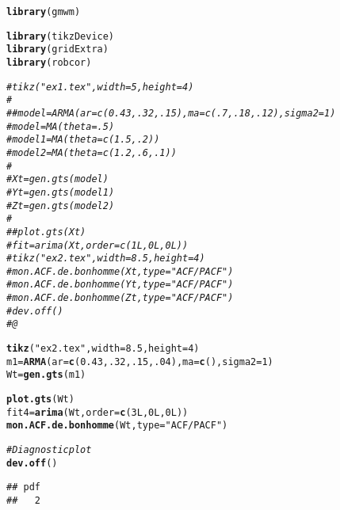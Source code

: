 \documentclass{article}\usepackage[]{graphicx}\usepackage[]{color}
\makeatletter
\newcommand{\hlnum}[1]{\textcolor[rgb]{0.686,0.059,0.569}{#1}}%
\newcommand{\hlstr}[1]{\textcolor[rgb]{0.192,0.494,0.8}{#1}}%
\newcommand{\hlcom}[1]{\textcolor[rgb]{0.678,0.584,0.686}{\textit{#1}}}%
\newcommand{\hlstd}[1]{\textcolor[rgb]{0.345,0.345,0.345}{#1}}%
\newcommand{\hlkwb}[1]{\textcolor[rgb]{0.69,0.353,0.396}{#1}}%
\newcommand{\hlkwc}[1]{\textcolor[rgb]{0.333,0.667,0.333}{#1}}%
\newcommand{\hlkwd}[1]{\textcolor[rgb]{0.737,0.353,0.396}{\textbf{#1}}}%
\newenvironment{kframe}{%
 \def\at@end@of@kframe{}%
 \ifinner\ifhmode%
  \def\at@end@of@kframe{\end{minipage}}%
  \begin{minipage}{\columnwidth}%
 \fi\fi%
 \def\FrameCommand##1{\hskip\@totalleftmargin \hskip-\fboxsep
 \colorbox{shadecolor}{##1}\hskip-\fboxsep
     \hskip-\linewidth \hskip-\@totalleftmargin \hskip\columnwidth}%
 \MakeFramed {\advance\hsize-\width
   \@totalleftmargin\z@ \linewidth\hsize
   \@setminipage}}%
 {\par\unskip\endMakeFramed%
 \at@end@of@kframe}
\newenvironment{knitrout}{}{} %
\makeatother
\begin{document}
\begin{knitrout}
\color{fgcolor}\begin{kframe}
\begin{alltt}
\hlkwd{library}\hlstd{(gmwm)}
\end{alltt}


{\ttfamily\noindent\itshape\color{messagecolor}{\#\# Loading required package: ggplot2}}\begin{alltt}
\hlkwd{library}\hlstd{(tikzDevice)}
\hlkwd{library}\hlstd{(gridExtra)}
\hlkwd{library}\hlstd{(robcor)}

\hlcom{# tikz("ex1.tex", width = 5, height = 4)}
\hlcom{# }
\hlcom{# #model = ARMA(ar = c(0.43,.32, .15), ma = c(.7, .18, .12),sigma2 = 1)}
\hlcom{# model = MA(theta = .5)}
\hlcom{# model1 = MA(theta = c(1.5,.2))}
\hlcom{# model2 = MA(theta = c(1.2,.6,.1))}
\hlcom{# }
\hlcom{# Xt = gen.gts(model)}
\hlcom{# Yt = gen.gts(model1)}
\hlcom{# Zt = gen.gts(model2)}
\hlcom{# }
\hlcom{# #plot.gts(Xt)}
\hlcom{# fit = arima(Xt,order = c(1L,0L,0L))}
\hlcom{# tikz("ex2.tex", width = 8.5, height = 4)}
\hlcom{# mon.ACF.de.bonhomme(Xt, type = "ACF/PACF")}
\hlcom{# mon.ACF.de.bonhomme(Yt, type = "ACF/PACF")}
\hlcom{# mon.ACF.de.bonhomme(Zt, type = "ACF/PACF")}
\hlcom{# dev.off()}
\hlcom{# @}

\hlkwd{tikz}\hlstd{(}\hlstr{"ex2.tex"}\hlstd{,} \hlkwc{width} \hlstd{=} \hlnum{8.5}\hlstd{,} \hlkwc{height} \hlstd{=} \hlnum{4}\hlstd{)}
\hlstd{m1} \hlkwb{=} \hlkwd{ARMA}\hlstd{(}\hlkwc{ar} \hlstd{=} \hlkwd{c}\hlstd{(}\hlnum{0.43}\hlstd{,}\hlnum{.32}\hlstd{,} \hlnum{.15}\hlstd{,} \hlnum{.04}\hlstd{),} \hlkwc{ma} \hlstd{=} \hlkwd{c}\hlstd{() ,}\hlkwc{sigma2} \hlstd{=} \hlnum{1}\hlstd{)}
\hlstd{Wt} \hlkwb{=} \hlkwd{gen.gts}\hlstd{(m1)}

\hlkwd{plot.gts}\hlstd{(Wt)}
\hlstd{fit4} \hlkwb{=} \hlkwd{arima}\hlstd{(Wt,}\hlkwc{order} \hlstd{=} \hlkwd{c}\hlstd{(}\hlnum{3L}\hlstd{,}\hlnum{0L}\hlstd{,}\hlnum{0L}\hlstd{))}
\hlkwd{mon.ACF.de.bonhomme} \hlstd{(Wt,} \hlkwc{type} \hlstd{=} \hlstr{"ACF/PACF"}\hlstd{)}
\end{alltt}


{\ttfamily\noindent\color{warningcolor}{\#\# Warning: Removed 1 rows containing missing values (geom\_segment).}}\begin{alltt}
\hlcom{# Diagnostic plot}
\hlkwd{dev.off}\hlstd{()}
\end{alltt}
\begin{verbatim}
## pdf 
##   2
\end{verbatim}
\end{kframe}
\end{knitrout}

\begin{figure}

\end{figure}

% 

% 
\end{document}
